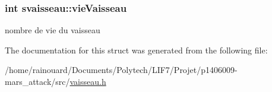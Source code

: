\subsubsection[{\texorpdfstring{vie\+Vaisseau}{vieVaisseau}}]{\setlength{\rightskip}{0pt plus 5cm}int svaisseau\+::vie\+Vaisseau}\hypertarget{structsvaisseau_a661f9d4831ee4968817162c5df602946}{}\label{structsvaisseau_a661f9d4831ee4968817162c5df602946}
nombre de vie du vaisseau 

The documentation for this struct was generated from the following file\+:\begin{DoxyCompactItemize}
\item 
/home/rainouard/\+Documents/\+Polytech/\+L\+I\+F7/\+Projet/p1406009-\/mars\+\_\+attack/src/\hyperlink{vaisseau_8h}{vaisseau.\+h}\end{DoxyCompactItemize}
